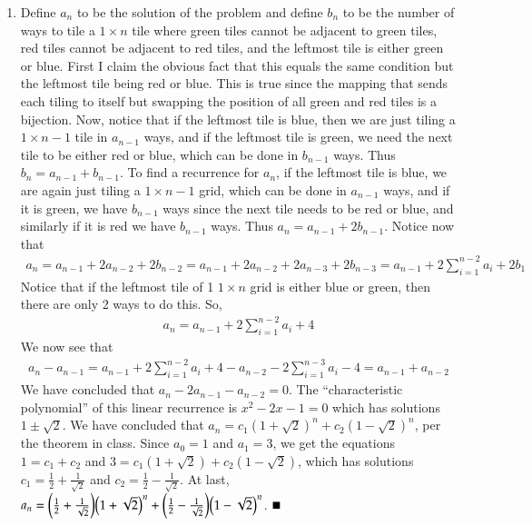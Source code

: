 \documentclass[12pt]{article}
\theoremstyle{definition}
\theoremstyle{remark}
\begin{document}
\begin{enumerate}[leftmargin=\labelsep]
		\item Define $a_n$ to be the solution of the problem and define $b_n$ to be the number of ways to tile a $1 \times n$ tile where green tiles cannot be adjacent to green tiles, red tiles cannot be adjacent to red tiles, and the leftmost tile is either green or blue. First I claim the obvious fact that this equals the same condition but the leftmost tile being red or blue. This is true since the mapping that sends each tiling to itself but swapping the position of all green and red tiles is a bijection. Now, notice that if the leftmost tile is blue, then we are just tiling a $1 \times n-1$ tile in $a_{n-1}$ ways, and if the leftmost tile is green, we need the next tile to be either red or blue, which can be done in $b_{n-1}$ ways. Thus $b_n = a_{n-1} + b_{n-1}$. To find a recurrence for $a_n$, if the leftmost tile is blue, we are again just tiling a $1 \times n-1$ grid, which can be done in $a_{n-1}$ ways, and if it is green, we have $b_{n-1}$ ways since the next tile needs to be red or blue, and similarly if it is red we have $b_{n-1}$ ways. Thus $a_n = a_{n-1} + 2b_{n-1}$. Notice now that
		\begin{align*}
			a_n = a_{n-1} + 2a_{n-2}+2b_{n-2} = a_{n-1} + 2a_{n-2} + 2a_{n-3} + 2b_{n-3} = a_{n-1} + 2\sum_{i=1}^{n-2} a_i + 2b_1
		\end{align*}
		Notice that if the leftmost tile of 1 $1 \times n$ grid is either blue or green, then there are only 2 ways to do this. So, 
		\begin{align*}
			a_n = a_{n-1} + 2\sum_{i=1}^{n-2} a_i + 4
		\end{align*}
		We now see that
		\begin{align*}
			a_{n} - a_{n-1} = a_{n-1} + 2\sum_{i=1}^{n-2}a_i + 4 - a_{n-2} - 2\sum_{i=1}^{n-3} a_i - 4 = a_{n-1} + a_{n-2}
		\end{align*}
		We have concluded that $a_{n} - 2a_{n-1} - a_{n-2} = 0$. The ``characteristic polynomial'' of this linear recurrence is $x^2 - 2x - 1 = 0$ which has solutions $1 \pm \sqrt{2}$. We have concluded that $a_n = c_1(1+\sqrt{2})^n + c_2(1-\sqrt{2})^n$, per the theorem in class. Since $a_0 = 1$ and $a_1 = 3$, we get the equations $1 = c_1 + c_2$ and $3 = c_1(1+\sqrt{2})+c_2(1-\sqrt{2})$, which has solutions $c_1 = \frac12 + \frac1{\sqrt{2}}$ and $c_2 = \frac12 - \frac{1}{\sqrt{2}}$. At last, $a_n = \qty(\frac12 + \frac1{\sqrt{2}})\qty(1+\sqrt{2})^n + \qty(\frac12 - \frac{1}{\sqrt{2}})\qty(1-\sqrt{2})^n$. $\hfill \blacksquare$
		

\end{enumerate}
\end{document}
